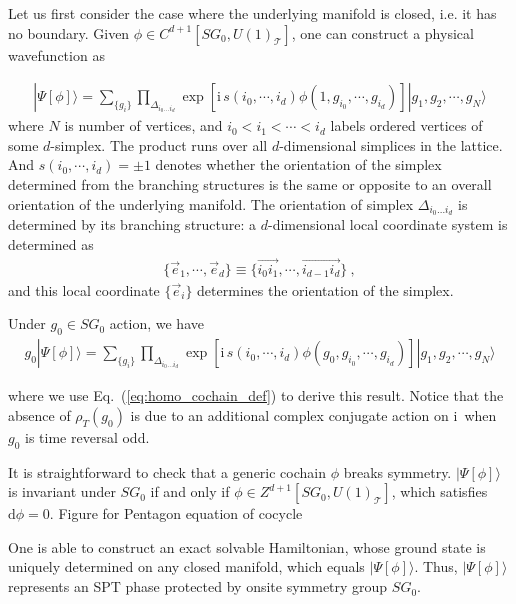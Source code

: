 \documentclass[reprint,amsmath,amssymb,aps,pra,]{revtex4-1}
\newcommand{\dd}{\mathrm{d}} %
\newcommand{\ii}{\mathrm{i}\,} %
\newcommand{\TT}{\mathcal{T}} %
\begin{document}
Let us first consider the case where the underlying manifold is closed, i.e. it has no boundary.
Given $\phi\in C^{d+1}[SG_0,U(1)_\TT]$, one can construct a physical wavefunction as
\begin{widetext}
  \begin{align}
    |\Psi[\phi]\rangle=\sum_{\{g_i\}}\prod_{\Delta_{i_0\ldots i_{d}}}\exp\left[ \ii s(i_0,\cdots,i_{d})\phi(1,g_{i_0},\cdots,g_{i_{d}})\right]|g_1,g_2,\cdots,g_N\rangle
    \label{eq:wf_from_cochain}
  \end{align}
  where $N$ is number of vertices, and $i_0<i_1<\cdots<i_d$ labels ordered vertices of some $d$-simplex.
  The product runs over all $d$-dimensional simplices in the lattice.
  And $s(i_0,\cdots,i_{d})=\pm1$ denotes whether the orientation of the simplex determined from the branching structures is the same or opposite to an overall orientation of the underlying manifold.
  The orientation of simplex $\Delta_{i_0\ldots i_d}$ is determined by its branching structure: a $d$-dimensional local coordinate system is determined as
  \begin{align}
    \{\vec{e}_1,\cdots,\vec{e}_d\}\equiv\{\overrightarrow{i_0i_1},\cdots,\overrightarrow{i_{d-1}i_{d}}\}~,
    \label{eq:branch_local_coord}
  \end{align}
  and this local coordinate $\{\vec{e}_i\}$ determines the orientation of the simplex.

  Under $g_0\in SG_0$ action, we have
  \begin{align}
    g_0|\Psi[\phi]\rangle=\sum_{\{g_i\}}\prod_{\Delta_{i_0\ldots i_{d}}}\exp\left[ \ii s(i_0,\cdots,i_{d})\phi(g_0,g_{i_0},\cdots,g_{i_{d}})\right]|g_1,g_2,\cdots,g_N\rangle
    \label{eq:sym_action_wf_from_cochain}
  \end{align}
\end{widetext}
where we use Eq.~(\ref{eq:homo_cochain_def}) to derive this result.
Notice that the absence of $\rho_T(g_0)$ is due to an additional complex conjugate action on $\ii$ when $g_0$ is time reversal odd.

It is straightforward to check that a generic cochain $\phi$ breaks symmetry. 
$|\Psi[\phi]\rangle$ is invariant under $SG_0$ if and only if $\phi\in Z^{d+1}[SG_0,U(1)_\TT]$, which satisfies $\dd\phi=0$. 
{\color{red} Figure for Pentagon equation of cocycle}

One is able to construct an exact solvable Hamiltonian, whose ground state is uniquely determined on any closed manifold, which equals $|\Psi[\phi]\rangle$.
Thus, $|\Psi[\phi]\rangle$ represents an SPT phase protected by onsite symmetry group $SG_0$.
\end{document}
